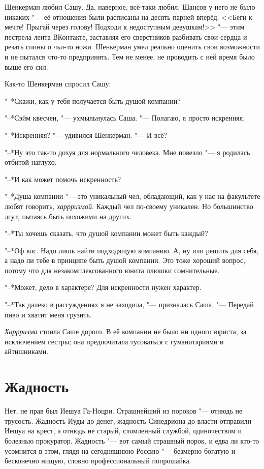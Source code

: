 Шенкерман любил Сашу.
Да, наверное, всё-таки любил.
Шансов у него не было никаких "--- её отношения были расписаны на десять парней вперёд.
<<Беги к мечте!
Прыгай через голову!
Подходи к недоступным девушкам!>> "--- этим пестрела лента ВКонтакте, заставляя его сверстников разбивать свои сердца и резать спины о чьи-то ножи.
Шенкерман умел реально оценить свои возможности и не пытался что-то предпринять.
Тем не менее, не проводить с ней время было выше его сил.

Как-то Шенкерман спросил Сашу:

"--*Скажи, как у тебя получается быть душой компании?

"--*Сэйм квесчен, "--- ухмыльнулась Саша.
"--- Полагаю, я просто искренняя.

"--*Искренняя? "--- удивился Шенкерман.
"--- И всё?

"--*Ну это так-то дохуя для нормального человека.
Мне повезло "--- я родилась отбитой наглухо.

"--*И как может помочь искренность?

"--*Душа компании "--- это уникальный чел, обладающий, как у нас на факультете любят говорить, \emph{харрризмой}.
Каждый чел по-своему уникален.
Но большинство лгут, пытаясь быть похожими на других.

"--*Ты хочешь сказать, что душой компании может быть каждый?

"--*Оф кос.
Надо лишь найти подходящую компанию.
А, ну или решить для себя, а надо ли тебе в принципе быть душой компании.
Это тоже хороший вопрос, потому что для незакомплексованного юнита плюшки сомнительные.

"--*Может, дело в характере?
Для искренности нужен характер.

"--*Так далеко в рассуждениях я не заходила, "--- призналась Саша.
"--- Передай пиво и хватит меня грузить.

\emph{Харрризма} стоила Саше дорого.
В её компании не было ни одного юриста, за исключением сестры;
она предпочитала тусоваться с гуманитариями и айтишниками.

\section{Жадность}

Нет, не прав был Иешуа Га-Ноцри.
Страшнейший из пороков "--- отнюдь не трусость.
Жадность Иуды до денег, жадность Синедриона до власти отправили Иешуа на крест, а отнюдь не старый, сломленный службой, одиночеством и болезнью прокуратор.
Жадность "--- вот самый страшный порок, и едва ли кто-то усомнится в этом, глядя на сегодняшнюю Россию "--- безмерно богатую и бесконечно нищую, словно профессиональный попрошайка.

